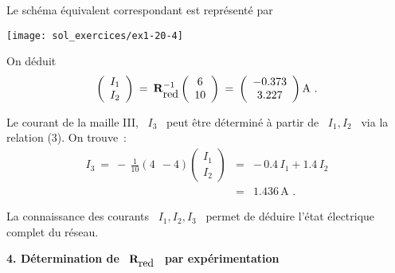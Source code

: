 Le schéma équivalent correspondant est représenté par 
\begin{center}
\texttt{[image: sol\_exercices/ex1-20-4]}
\end{center}

On déduit
\[ \left( \begin{array}{c} I_1\\ I_2 \end{array} \right) 
\: = \: {\bf R}_{\mbox{red}}^{-1} \left( \begin{array}{c} 6\\ 10  \end{array} \right) 
\: = \: \left( \begin{array}{c} -0.373\\ 3.227  \end{array} \right)  \text{A~.} \]

Le courant de la maille III, \ $I_3$ \, peut être déterminé à partir de
\ $I_1,I_2$ \ via la relation (3).
On trouve~:
\begin{eqnarray*}
I_3 \: = \: -\, \frac{1}{10} \left( 4 ~~-4 \right) 
\left( \begin{array}{c} I_1\\ I_2 \end{array} \right) 
&=& -\, 0.4 \, I_1 + 1.4 \, I_2 \\
&= & 1.436 \, \text{A~.}
\end{eqnarray*}

La connaissance des courants \ $I_1,I_2,I_3$ \ permet de déduire
l'état électrique complet du réseau.

{\bf 4. Détermination de} \ ${\bf R}_{\mbox{red}}$ \ {\bf par expérimentation}

